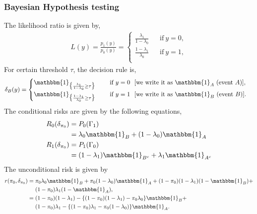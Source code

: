 \documentclass[a4paper,english,12pt]{article}
\begin{document}
\begin{exmp}
\subsubsection*{Bayesian Hypothesis testing}
The likelihood ratio is given by,
\begin{eqnarray}
L(y) = \frac{p_1(y)}{p_0(y)} =
								\begin{cases}
								\frac{\lambda_1}{1-\lambda_0} ~~~~~~~\mbox{if}~ y=0, \\
								\frac{1-\lambda_1}{\lambda_0} ~~~~~~~\mbox{if}~ y=1,\\
								\end{cases} 
\end{eqnarray}
For certain threshold $\tau$, the decision rule is,
\begin{eqnarray}
\delta_{B}(y)= 
				\begin{cases} \mathbbm{1}_{\bigl\{\frac{\lambda_1}{1-\lambda_0}\geq\tau\bigr\}} ~~~~~~~\mbox{if}~ y=0~~\mbox{[we~write~it~as~$\mathbbm{1}_{A}$~(event~$A$)]},\\
				\mathbbm{1}_{\bigl\{\frac{1-\lambda_1}{\lambda_0}\geq\tau\bigr\}} ~~~~~~~\mbox{if}~ y=1~~\mbox{[we~write~it~as~$\mathbbm{1}_{B}$~(event~$B$)]}.\\
				\end{cases}
\end{eqnarray}
The conditional risks are given by the following equations,
\begin{align}
R_{0}(\delta_{\pi_{0}})&=P_{0}(\Gamma_{1})\nonumber\\
					   &=\lambda_{0}\mathbbm{1}_{B}+(1-\lambda_{0})\mathbbm{1}_{A}\\
R_{1}(\delta_{\pi_{0}})&=P_{1}(\Gamma_{0})\nonumber\\
					   &=(1-\lambda_{1})\mathbbm{1}_{B^{c}}+\lambda_{1}\mathbbm{1}_{A^{c}}
\end{align}
The unconditional risk is given by
\begin{align}
r(\pi_{0},\delta_{\pi_{0}})&=\pi_{0}\lambda_{0}\mathbbm{1}_{B}+\pi_{0}(1-\lambda_{0})\mathbbm{1}_{A}+(1-\pi_{0})(1-\lambda_{1})(1-\mathbbm{1}_{B})+\nonumber\\
						   &~~~~(1-\pi_{0})\lambda_{1}(1-\mathbbm{1}_{A}),\nonumber\\
						   &=(1-\pi_{0})(1-\lambda_{1})-{\{(1-\pi_{0})(1-\lambda_{1})-\pi_{0}\lambda_{0}\}}\mathbbm{1}_{B}+\nonumber\\
						   &~~~~(1-\pi_{0})\lambda_{1}-{\{(1-\pi_{0})\lambda_{1}-\pi_{0}(1-\lambda_{0})\}}\mathbbm{1}_{A}.
\end{align}

\end{exmp}
\end{document}
